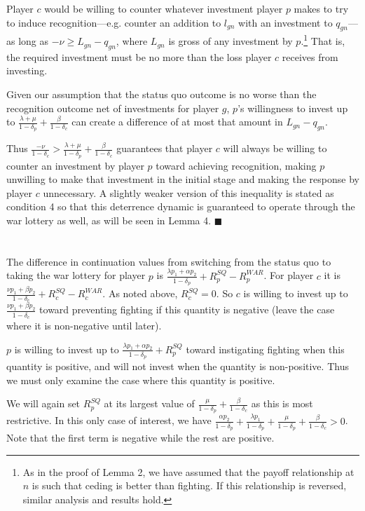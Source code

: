 \documentclass[12pt]{article}
\newcommand{\de}{\delta}
\begin{document}
Player $c$ would be willing to counter whatever investment player $p$ makes to try to induce recognition---e.g. counter an addition to $l_{gn}$ with an investment to $q_{gn}$---as long as $-\nu \geq L_{gn} - q_{gn}$, where $L_{gn}$ is gross of any investment by $p$.\footnote{As in the proof of Lemma 2, we have assumed that the payoff relationship at $n$ is such that ceding is better than fighting. If this relationship is reversed, similar analysis and results hold.} That is, the required investment must be no more than the loss player $c$ receives from investing.

Given our assumption that the status quo outcome is no worse than the recognition outcome net of investments for player $g$, $p$'s willingness to invest up to $\frac{\lambda + \mu}{1 -\de_p} + \frac{\beta}{1 -\de_c}$ can create a difference of at most that amount in $L_{gn} - q_{gn}$. 

Thus $\frac{-\nu}{1 -\de_c} > \frac{\lambda + \mu}{1 -\de_p} + \frac{\beta}{1 -\de_c}$ guarantees that player $c$ will always be willing to counter an investment by player $p$ toward achieving recognition, making $p$ unwilling to make that investment in the initial stage and making the response by player $c$ unnecessary. A slightly weaker version of this inequality is stated as condition 4 so that this deterrence dynamic is guaranteed to operate through the war lottery as well, as will be seen in Lemma 4. \hfill $\blacksquare$
\\
\\
 \\
The difference in continuation values from switching from the status quo to taking the war lottery for player $p$ is $\frac{\lambda p_1 + \alpha p_2 }{1 -\de_p} +R_p^{SQ} -R_p^{WAR}$. For player $c$ it is $\frac{\nu p_1 + \beta p_2}{1 -\de_c} + R_c^{SQ} -R_c^{WAR}$. As noted above, $R_c^{SQ} =0$. So $c$ is willing to invest up to $\frac{\nu p_1 + \beta p_2}{1 -\de_c}$ toward preventing fighting if this quantity is negative (leave the case where it is non-negative until later).

$p$ is willing to invest up to $\frac{\lambda p_1 + \alpha p_2 }{1 -\de_p} +R_p^{SQ}$ toward instigating fighting when this quantity is positive, and will not invest when the quantity is non-positive. Thus we must only examine the case where this quantity is positive.

We will again set $R_p^{SQ}$ at its largest value of $\frac{\mu}{1-\de_p} + \frac{\beta}{1 - \de_c}$ as this is most restrictive. In this only case of interest, we have $\frac{\alpha p_2}{1 -\de_p} +\frac{\lambda p_1}{1 -\de_p} + \frac{\mu}{1-\de_p} + \frac{\beta}{1 - \de_c}> 0$. Note that the first term is negative while the rest are positive.
\end{document}
